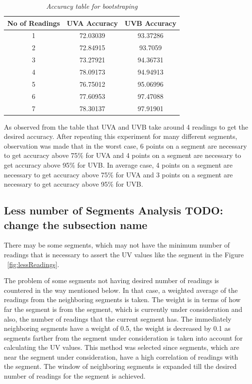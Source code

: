 \documentclass[conference]{IEEETran}
\begin{document}
\begin{table}[h]
\centering
\begin{tabular}{|c|c|c|}
\hline
No of Readings & UVA Accuracy & UVB Accuracy \\
\hline 
1 & 72.03039 & 93.37286\\
\hline
2 & 72.84915 & 93.7059 \\
\hline
3 & 73.27921	& 94.36731\\
\hline
4 & 78.09173	& 94.94913\\
\hline
5 & 76.75012 & 95.06996 \\
\hline
6 & 77.60953 & 97.47088 \\
\hline
7 & 78.30137 & 97.91901\\
\hline
\end{tabular}
\caption{\small \sl Accuracy table for bootstraping}
\end{table}

As observed from the table that UVA and UVB take around 4 readings to get the desired accuracy. After repeating this experiment for many different segments, observation was made that in the worst case, 6 points on a segment are necessary to get accuracy above 75\% for UVA and 4 points on a segment are necessary to get accuracy above 95\% for UVB.
In average case, 4 points on a segment are necessary to get accuracy above 75\% for UVA and  3 points on a segment are necessary to get accuracy above 95\% for UVB.


\subsection{Less number of Segments Analysis TODO: change the subsection name}
There may be some segments, which may not have the minimum number of readings that is necessary to assert the UV values like the segment in the Figure ~\ref{fig:lessReadings}. 

The problem of some segments not having desired number of readings is countered in the way mentioned below. In that case, a weighted average of the readings from the neighboring segments is taken. The weight is in terms of how far the segment is from the segment, which is currently under consideration and also, the number of readings that the current segment has. The immediately neighboring segments have a weight of 0.5, the weight is decreased by 0.1 as segments farther from the segment under consideration is taken into account for calculating the UV values. This method was selected since segments, which are near the segment under consideration, have a high correlation of readings with the segment. The window of neighboring segments is expanded till the desired number of readings for the segment is achieved. 
\end{document}

